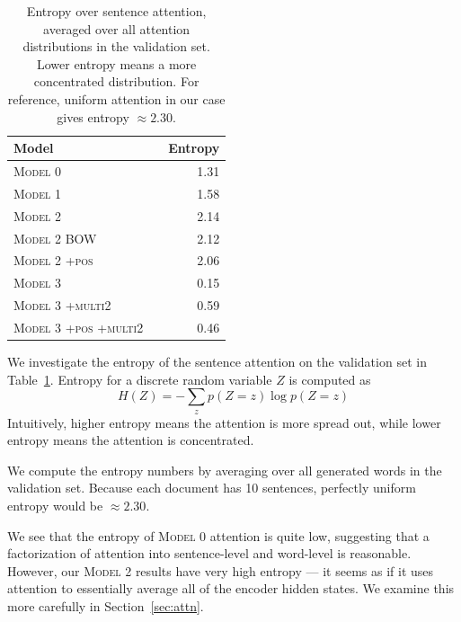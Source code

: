 \documentclass[12pt]{report}
\begin{document}
\begin{table}[t]
\centering
\begin{tabular}{llr}
\toprule
Model & & Entropy \\
\midrule
\textsc{Model 0} & & 1.31 \\
\textsc{Model 1} & & 1.58 \\
\textsc{Model 2} & & 2.14\\
\textsc{Model 2 BOW} & & 2.12 \\
\textsc{Model 2 +pos} & & 2.06 \\
\textsc{Model 3 } & & 0.15 \\
\textsc{Model 3  +multi2} & & 0.59 \\
\textsc{Model 3  +pos +multi2} & & 0.46 \\
\bottomrule
\end{tabular}
\caption[Sentence Attention Entropy]{Entropy over sentence attention, averaged over all attention distributions in the validation set. Lower entropy means a more concentrated distribution. For reference, uniform attention in our case gives entropy $\approx 2.30$.}
\label{table:entropy}
\end{table}

We investigate the entropy of the sentence attention on the validation set in Table~\ref{table:entropy}. Entropy for a discrete random variable $Z$ is computed as
$$H(Z) = -\sum_{z} p(Z = z) \log p(Z = z)$$
Intuitively, higher entropy means the attention is more spread out, while lower entropy means the attention is concentrated.

We compute the entropy numbers by averaging over all generated words in the validation set. Because each document has 10 sentences, perfectly uniform entropy would be $\approx 2.30$.

We see that the entropy of \textsc{Model 0} attention is quite low, suggesting that a factorization of attention into sentence-level and word-level is reasonable. However, our \textsc{Model 2} results have very high entropy --- it seems as if it uses attention to essentially average all of the encoder hidden states. We examine this more carefully in Section~\ref{sec:attn}.

\end{document}
